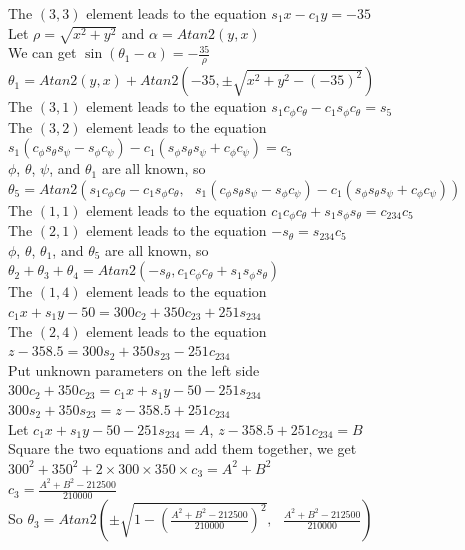 \documentclass[12pt, a4paper]{article}
\begin{document}
\begin{enumerate}[(1)]
\newpage
The $(3, 3)$ element leads to the equation $s_1x - c_1y = -35$ \\
Let $\rho = \sqrt{x^2 + y^2}$ and $\alpha = Atan2(y, x)$ \\
We can get $\sin (\theta_1 - \alpha) = -\frac{35}{\rho}$ \\
$\theta_1 = Atan2(y, x) + Atan2(-35, \pm \sqrt{x^2 + y^2 - (-35)^2})$ \\

\vspace*{0cm}
The $(3, 1)$ element leads to the equation $s_1 c_\phi c_\theta - c_1 s_\phi c_\theta = s_5$ \\
The $(3, 2)$ element leads to the equation \\ $s_1(c_\phi s_\theta s_\psi - s_\phi c_\psi) - c_1(s_\phi s_\theta s_\psi + c_\phi c_\psi) = c_5$ \\
$\phi$, $\theta$, $\psi$, and $\theta_1$ are all known, so \\ 
$\theta_5 = Atan2(s_1 c_\phi c_\theta - c_1 s_\phi c_\theta, \mbox{ } s_1(c_\phi s_\theta s_\psi - s_\phi c_\psi) - c_1(s_\phi s_\theta s_\psi + c_\phi c_\psi))$ \\

\vspace*{0cm}
The $(1, 1)$ element leads to the equation $c_1 c_\phi c_\theta + s_1 s_\phi s_\theta = c_{234}c_5$ \\
The $(2, 1)$ element leads to the equation $-s_\theta = s_{234}c_5$ \\
$\phi$, $\theta$, $\theta_1$, and $\theta_5$ are all known, so \\
$\theta_2 + \theta_3 + \theta_4 = Atan2(-s_\theta, c_1 c_\phi c_\theta + s_1 s_\phi s_\theta)$ \\

\vspace*{0cm}
The $(1, 4)$ element leads to the equation\\ $c_1 x + s_1 y - 50 = 300c_2+350c_{23}+251s_{234}$ \\
The $(2, 4)$ element leads to the equation\\ $z - 358.5 = 300s_2+350s_{23}-251c_{234}$ \\
Put unknown parameters on the left side \\
$300c_2 + 350c_{23} = c_1 x + s_1 y - 50 - 251s_{234}$ \\
$300s_2 + 350s_{23} = z - 358.5 + 251c_{234}$ \\
Let $c_1 x + s_1 y - 50 - 251s_{234} = A$, $z - 358.5 + 251c_{234} = B$ \\
Square the two equations and add them together, we get \\
$300^2 + 350^2 + 2 \times 300 \times 350 \times c_3 = A^2 + B^2$ \\
$c_3 = \frac{A^2 + B^2 - 212500}{210000}$ \\
So $\theta_3 = Atan2(\pm \sqrt{1 - (\frac{A^2 + B^2 - 212500}{210000})^2}, \mbox{ } \frac{A^2 + B^2 - 212500}{210000})$ \\


\end{enumerate}
\end{document}
